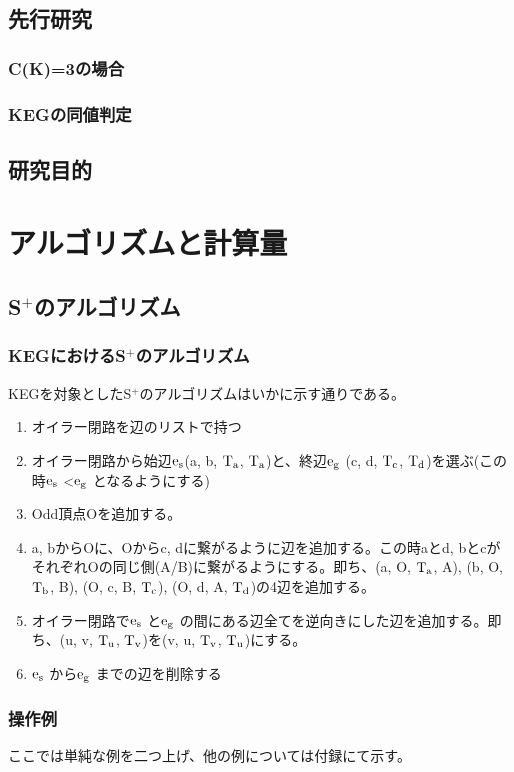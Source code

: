 \documentclass[11pt,a4j]{jreport}
\newcommand{\splus}{S${}^\text{+}$}
\newcommand{\fl}[1]{$\rm{#1}$}
\begin{document}
\section{先行研究}
\subsection{C(K)=3の場合}
\subsection{KEGの同値判定}

\section{研究目的}

\chapter{アルゴリズムと計算量}

\section{\splus のアルゴリズム}
\subsection{KEGにおける\splus のアルゴリズム}
KEGを対象とした\splus のアルゴリズムはいかに示す通りである。
\begin{enumerate}
    \item オイラー閉路を辺のリストで持つ
    \item オイラー閉路から始辺\fl{e_s}(a, b, \fl{T_a}, \fl{T_a})と、終辺\fl{e_g} (c, d, \fl{T_c}, \fl{T_d})を選ぶ(この時\fl{e_s} <\fl{e_g} となるようにする)
    \item Odd頂点Oを追加する。
    \item a, bからOに、Oからc, dに繋がるように辺を追加する。この時aとd, bとcがそれぞれOの同じ側(A/B)に繋がるようにする。即ち、(a, O, \fl{T_a}, A), (b, O, \fl{T_b}, B), (O, c, B, \fl{T_c}), (O, d, A, \fl{T_d})の4辺を追加する。
    \item オイラー閉路で\fl{e_s} と\fl{e_g} の間にある辺全てを逆向きにした辺を追加する。即ち、(u, v, \fl{T_u}, \fl{T_v})を(v, u, \fl{T_v}, \fl{T_u})にする。
    \item \fl{e_s} から\fl{e_g} までの辺を削除する
\end{enumerate}
\subsection{操作例}
ここでは単純な例を二つ上げ、他の例については付録にて示す。
\end{document}
